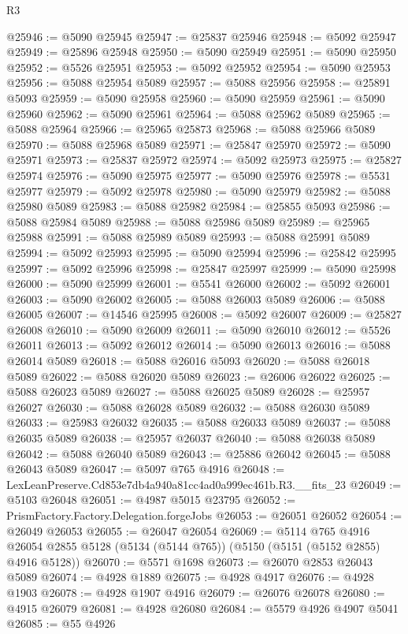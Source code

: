 \begin{lexlean}{R3}
\begin{coremodule}
@25946 := @5090 @25945
@25947 := @25837 @25946
@25948 := @5092 @25947
@25949 := @25896 @25948
@25950 := @5090 @25949
@25951 := @5090 @25950
@25952 := @5526 @25951
@25953 := @5092 @25952
@25954 := @5090 @25953
@25956 := @5088 @25954 @5089
@25957 := @5088 @25956
@25958 := @25891 @5093
@25959 := @5090 @25958
@25960 := @5090 @25959
@25961 := @5090 @25960
@25962 := @5090 @25961
@25964 := @5088 @25962 @5089
@25965 := @5088 @25964
@25966 := @25965 @25873
@25968 := @5088 @25966 @5089
@25970 := @5088 @25968 @5089
@25971 := @25847 @25970
@25972 := @5090 @25971
@25973 := @25837 @25972
@25974 := @5092 @25973
@25975 := @25827 @25974
@25976 := @5090 @25975
@25977 := @5090 @25976
@25978 := @5531 @25977
@25979 := @5092 @25978
@25980 := @5090 @25979
@25982 := @5088 @25980 @5089
@25983 := @5088 @25982
@25984 := @25855 @5093
@25986 := @5088 @25984 @5089
@25988 := @5088 @25986 @5089
@25989 := @25965 @25988
@25991 := @5088 @25989 @5089
@25993 := @5088 @25991 @5089
@25994 := @5092 @25993
@25995 := @5090 @25994
@25996 := @25842 @25995
@25997 := @5092 @25996
@25998 := @25847 @25997
@25999 := @5090 @25998
@26000 := @5090 @25999
@26001 := @5541 @26000
@26002 := @5092 @26001
@26003 := @5090 @26002
@26005 := @5088 @26003 @5089
@26006 := @5088 @26005
@26007 := @14546 @25995
@26008 := @5092 @26007
@26009 := @25827 @26008
@26010 := @5090 @26009
@26011 := @5090 @26010
@26012 := @5526 @26011
@26013 := @5092 @26012
@26014 := @5090 @26013
@26016 := @5088 @26014 @5089
@26018 := @5088 @26016 @5093
@26020 := @5088 @26018 @5089
@26022 := @5088 @26020 @5089
@26023 := @26006 @26022
@26025 := @5088 @26023 @5089
@26027 := @5088 @26025 @5089
@26028 := @25957 @26027
@26030 := @5088 @26028 @5089
@26032 := @5088 @26030 @5089
@26033 := @25983 @26032
@26035 := @5088 @26033 @5089
@26037 := @5088 @26035 @5089
@26038 := @25957 @26037
@26040 := @5088 @26038 @5089
@26042 := @5088 @26040 @5089
@26043 := @25886 @26042
@26045 := @5088 @26043 @5089
@26047 := @5097 @765 @4916
@26048 := LexLeanPreserve.Cd853e7db4a940a81cc4ad0a999ec461b.R3.__fits_23
@26049 := @5103 @26048
@26051 := @4987 @5015 @23795
@26052 := PrismFactory.Factory.Delegation.forgeJobs
@26053 := @26051 @26052
@26054 := @26049 @26053
@26055 := @26047 @26054
@26069 := @5114
    @765
    @4916
    @26054
    @2855
    @5128
    (@5134 (@5144 @765))
    (@5150 (@5151 (@5152 @2855) @4916 @5128))
@26070 := @5571 @1698
@26073 := @26070 @2853 @26043 @5089
@26074 := @4928 @1889
@26075 := @4928 @4917
@26076 := @4928 @1903
@26078 := @4928 @1907 @4916
@26079 := @26076 @26078
@26080 := @4915 @26079
@26081 := @4928 @26080
@26084 := @5579 @4926 @4907 @5041
@26085 := @55 @4926

\end{coremodule}
\end{lexlean}
